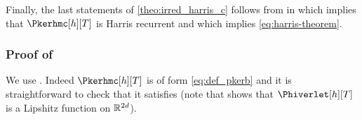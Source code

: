 
Finally, the last statements of \ref{theo:irred_harris_c} follows from  in  which implies that  $ \Pkerhmc[h][T]$ is Harris recurrent and  \cite[Theorem 13.0.1]{meyn:tweedie:2009} which implies  \eqref{eq:harris-theorem}.

\subsubsection{Proof of }
\label{sec:proof-crefth_irred_D}
We use . Indeed $\Pkerhmc[h][T]$ is
of form \eqref{eq:def_pkerb} and it is straightforward to check that it
satisfies  (note that 
shows that $\Phiverlet[h][T]$ is a Lipshitz function on $\mathbb{R}^{2d}$).

